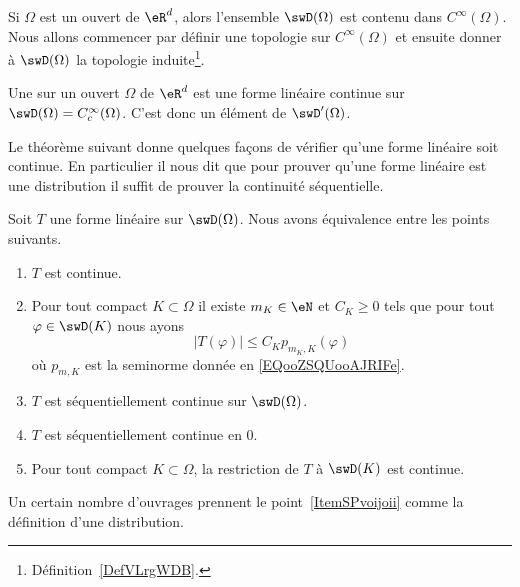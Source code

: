 Si \( \Omega\) est un ouvert de \( \eR^d\), alors l'ensemble \( \swD(\Omega)\) est contenu dans \(  C^{\infty}(\Omega)\). Nous allons commencer par définir une topologie sur \(  C^{\infty}(\Omega)\) et ensuite donner à \( \swD(\Omega)\) la topologie induite\footnote{Définition~\ref{DefVLrgWDB}.}.

\begin{definition}[Distribution]    \label{DefPZDtWVP}
	Une  sur un ouvert \( \Omega\) de \( \eR^d\) est une forme linéaire continue sur \(\swD(\Omega)= C^{\infty}_c(\Omega)\). C'est donc un élément de \( \swD'(\Omega)\).
\end{definition}

Le théorème suivant donne quelques façons de vérifier qu'une forme linéaire soit continue. En particulier il nous dit que pour prouver qu'une forme linéaire est une distribution il suffit de prouver la continuité séquentielle.
\begin{theorem} \label{ThoVDDBnVn}
	Soit \( T\) une forme linéaire sur \( \swD(\Omega)\). Nous avons équivalence entre les points suivants.
	\begin{enumerate}
		\item
		      \( T\) est continue.
		\item   \label{ItemSPvoijoii}
		      Pour tout compact \( K\subset \Omega\) il existe \( m_K\in \eN\) et \( C_K\geq 0\) tels que pour tout \( \varphi\in\swD(K)\) nous ayons
		      \begin{equation}
			      \big| T(\varphi) \big|\leq C_K p_{m_K,K}(\varphi)
		      \end{equation}
		      où \( p_{m,K}\) est la seminorme donnée en \eqref{EQooZSQUooAJRIFe}.
		\item       \label{ITEMooBXFSooYtAXjy}
		      \( T\) est séquentiellement continue sur \( \swD(\Omega)\).
		\item
		      \( T\) est séquentiellement continue en \( 0\).
		\item
		      Pour tout compact \( K\subset \Omega\), la restriction de \( T\) à \( \swD(K)\) est continue.
	\end{enumerate}
\end{theorem}
Un certain nombre d'ouvrages prennent le point~\ref{ItemSPvoijoii} comme la définition d'une distribution.

